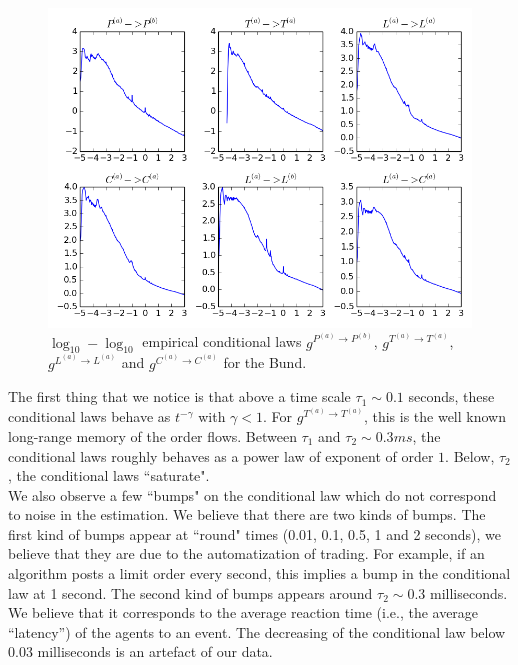 \documentclass[a4paper,11pt]{article}
\newcommand{\PA}{P^{(a)}}
\newcommand{\PB}{P^{(b)}}
\newcommand{\TA}{T^{(a)}}
\newcommand{\CA}{C^{(a)}}
\newcommand{\LA}{L^{(a)}}
\begin{document}
\begin{figure}[H]
\centering
\includegraphics[width=\textwidth]{loglogclaw3.png}
\caption{$\log_{10}-\log_{10}$ empirical conditional laws $g^{\PA\rightarrow \PB}$, $g^{\TA\rightarrow \TA}$, $g^{\LA\rightarrow \LA}$ and $g^{\CA\rightarrow \CA}$ for the Bund.
}
\label{llclaw3}
\end{figure}


\noindent The first thing that we notice is that above a time scale $\tau_1\sim 0.1$ seconds, these conditional laws behave as $t^{-\gamma}$ with $\gamma<1$. For $g^{\TA\rightarrow \TA}$, this
is the well known long-range memory of the order flows. Between $\tau_1$ and $\tau_2\sim 0.3 ms$, the conditional laws roughly behaves as a power law of exponent of order $1$. Below, $\tau_2$, the conditional laws ``saturate".\\

\noindent We also observe a few ``bumps" on the conditional law which do not correspond to noise in the estimation. We believe that there are two kinds of bumps. The first kind of bumps appear at ``round" times (0.01, 0.1, 0.5, 1 and 2 seconds), we believe that they are due to the automatization of trading. For example, if an algorithm posts a limit order every second, this implies a bump in the conditional law at 1 second. The second kind of bumps appears around $\tau_2\sim 0.3$ milliseconds. We believe that it corresponds to the average reaction time (i.e., the average ``latency'') of the agents  to an event. The decreasing of the conditional law below 0.03 milliseconds is an artefact of our data.\\
\end{document}
